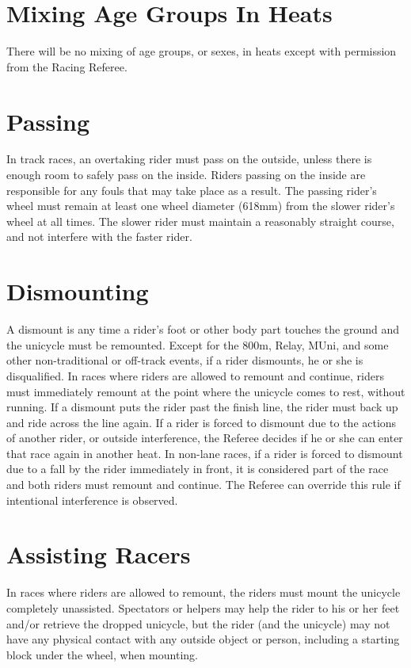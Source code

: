 \section{Mixing Age Groups In Heats}
There will be no mixing of age groups, or sexes, in heats except with permission from the Racing Referee.

\section{Passing}
In track races, an overtaking rider must pass on the outside, unless there is enough room to safely pass on the inside.
Riders passing on the inside are responsible for any fouls that may take place as a result.
The passing rider's wheel must remain at least one wheel diameter (618mm) from the slower rider's wheel at all times.
The slower rider must maintain a reasonably straight course, and not interfere with the faster rider.

\section{Dismounting}
A dismount is any time a rider's foot or other body part touches the ground and the unicycle must be remounted.
Except for the 800m, Relay, MUni, and some other non-traditional or off-track events, if a rider dismounts, he or she is disqualified.
In races where riders are allowed to remount and continue, riders must immediately remount at the point where the unicycle comes to rest, without running.
If a dismount puts the rider past the finish line, the rider must back up and ride across the line again.
If a rider is forced to dismount due to the actions of another rider, or outside interference, the Referee decides if he or she can enter that race again in another heat.
In non-lane races, if a rider is forced to dismount due to a fall by the rider immediately in front, it is considered part of the race and both riders must remount and continue.
The Referee can override this rule if intentional interference is observed.

\section{Assisting Racers}
In races where riders are allowed to remount, the riders must mount the unicycle completely unassisted.
Spectators or helpers may help the rider to his or her feet and/or retrieve the dropped unicycle, but the rider (and the unicycle) may not have any physical contact with any outside object or person, including a starting block under the wheel, when mounting.

